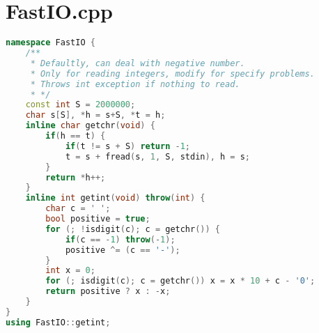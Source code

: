 \section{FastIO.cpp}
\begin{lstlisting}[language=c++]
namespace FastIO {
    /**
     * Defaultly, can deal with negative number.
     * Only for reading integers, modify for specify problems.
     * Throws int exception if nothing to read.
     * */
    const int S = 2000000;
    char s[S], *h = s+S, *t = h;
    inline char getchr(void) {
        if(h == t) {
            if(t != s + S) return -1;
            t = s + fread(s, 1, S, stdin), h = s;
        }
        return *h++;
    }
    inline int getint(void) throw(int) {
        char c = ' ';
        bool positive = true;
        for (; !isdigit(c); c = getchr()) {
            if(c == -1) throw(-1);
            positive ^= (c == '-');
        }
        int x = 0;
        for (; isdigit(c); c = getchr()) x = x * 10 + c - '0';
        return positive ? x : -x;
    }
}
using FastIO::getint;

\end{lstlisting}
